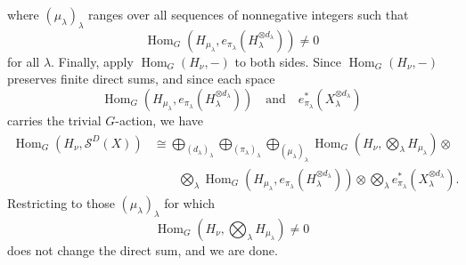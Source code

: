 \documentclass[11pt]{article}
\newcommand{\scS}{\mathcal{S}}
\newcommand{\HomG}[2]{\operatorname{Hom}_G\!\left(#1,#2\right)}
\theoremstyle{definition}
\begin{document}
where $(\mu_\lambda)_\lambda$ ranges over all sequences of nonnegative integers such that
\[
  \HomG{H_{\mu_\lambda}}{e_{\pi_\lambda}(H_\lambda^{\otimes d_\lambda})}\neq 0
\]
for all $\lambda$.
Finally, apply $\HomG{H_\nu}{-}$ to both sides.
Since $\HomG{H_\nu}{-}$ preserves finite direct sums, and since each space
\[
  \HomG{H_{\mu_\lambda}}{e_{\pi_\lambda}(H_\lambda^{\otimes d_\lambda})}
  \quad\text{and}\quad
  e_{\pi_\lambda}^*(X_\lambda^{\otimes d_\lambda})
\]
carries the trivial $G$-action, we have
\begin{align*}
  \HomG{H_\nu}{\scS^D(X)}
  &\cong
  \bigoplus_{(d_\lambda)_\lambda}
  \bigoplus_{(\pi_\lambda)_\lambda}
  \bigoplus_{(\mu_\lambda)_\lambda}
  \HomG{H_\nu}{\bigotimes_\lambda H_{\mu_\lambda}}\otimes\\
  &\qquad
  \bigotimes_\lambda
  \HomG{H_{\mu_\lambda}}{e_{\pi_\lambda}(H_\lambda^{\otimes d_\lambda})}
  \otimes
  \bigotimes_\lambda e_{\pi_\lambda}^*(X_\lambda^{\otimes d_\lambda}).
\end{align*}
Restricting to those $(\mu_\lambda)_\lambda$ for which
\[
  \HomG{H_\nu}{\bigotimes_\lambda H_{\mu_\lambda}}\neq 0
\]
does not change the direct sum, and we are done.
\end{document}
